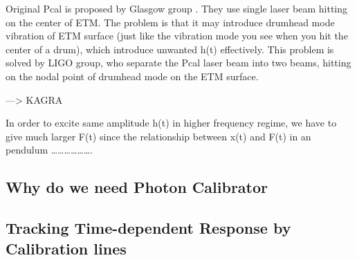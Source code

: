 Original Pcal is proposed by Glasgow group \cite{pcal:clubley2001}. They use single laser beam hitting on the center of ETM. The problem is that it may introduce drumhead mode vibration of ETM surface (just like the vibration mode you see when you hit the center of a drum), which introduce unwanted h(t) effectively. This problem is solved by LIGO group\cite{pcal:karki2016}, who separate the Pcal laser beam into two beams, hitting on the nodal point of drumhead mode on the ETM surface\cite{pcal:Daveloza2012}.  

 —> KAGRA

In order to excite same amplitude h(t) in higher frequency regime, we have to give much larger F(t) since the relationship between x(t) and F(t) in an pendulum ……………….



\subsection{Why do we need Photon Calibrator}
\subsection{Tracking Time-dependent Response by Calibration lines}
